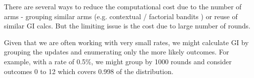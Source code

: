 \documentclass[11pt,a4,singlespacing,titlepagenumber=on]{scrreprt}
\numberwithin{equation}{chapter} %
\theoremstyle{remark}
\begin{document}
There are several ways to reduce the computational cost due to the number of arms - grouping similar arms (e.g. contextual / factorial bandits ) or reuse of similar GI calcs. But the limiting issue is the cost due to large number of rounds.

Given that we are often working with very small rates, we might calculate GI by grouping the updates and enumerating only the more likely outcomes. For example, with a rate of 0.5\%, we might group by 1000 rounds and consider outcomes 0 to 12 which covers 0.998 of the distribution. 
















\cleardoublepage
{}




{}


\appendix %
\end{document}
